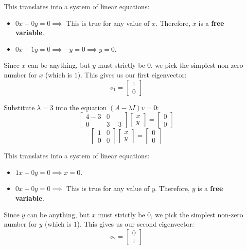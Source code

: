 \documentclass[twoside, 10pt]{article}
\begin{document}
This translates into a system of linear equations:
\begin{itemize}
    \item $0x + 0y = 0 \implies$ This is true for any value of $x$. Therefore, $x$ is a \textbf{free variable}.
    \item $0x - 1y = 0 \implies -y = 0 \implies y = 0$.
\end{itemize}

Since $x$ can be anything, but $y$ must strictly be $0$, we pick the simplest non-zero number for $x$ (which is $1$). This gives us our first eigenvector:
\[ v_1 = \begin{bmatrix} 1 \\ 0 \end{bmatrix} \]

Substitute $\lambda = 3$ into the equation $(A - \lambda I)v = 0$:
\[ \begin{bmatrix} 4-3 & 0 \\ 0 & 3-3 \end{bmatrix} \begin{bmatrix} x \\ y \end{bmatrix} = \begin{bmatrix} 0 \\ 0 \end{bmatrix} \]
\[ \begin{bmatrix} 1 & 0 \\ 0 & 0 \end{bmatrix} \begin{bmatrix} x \\ y \end{bmatrix} = \begin{bmatrix} 0 \\ 0 \end{bmatrix} \]

This translates into a system of linear equations:
\begin{itemize}
    \item $1x + 0y = 0 \implies x = 0$.
    \item $0x + 0y = 0 \implies$ This is true for any value of $y$. Therefore, $y$ is a \textbf{free variable}.
\end{itemize}

Since $y$ can be anything, but $x$ must strictly be $0$, we pick the simplest non-zero number for $y$ (which is $1$). This gives us our second eigenvector:
\[ v_2 = \begin{bmatrix} 0 \\ 1 \end{bmatrix} \]
\end{document}

